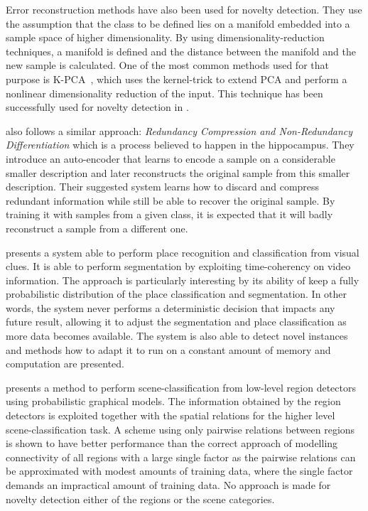 Error reconstruction methods have also been used for novelty detection.
They use the assumption that the class to be defined lies on a manifold embedded
into a sample space of higher dimensionality. By using dimensionality\hyp{}reduction
techniques, a manifold is defined and the distance between the manifold and the new sample
is calculated. One of the most common methods used for that purpose is
\gls{K-PCA}~\cite{scholkopf1997kernel}, which uses the kernel-trick to extend
\gls{PCA} and perform a nonlinear dimensionality reduction of the input.
This technique has been successfully used for novelty detection in \cite{Hoffmann2007863}.

\cite{japkowicz1995novelty} also follows a similar approach: \emph{Redundancy
Compression and Non-Redundancy Differentiation} which is a process believed
to happen in the hippocampus. They introduce an auto-encoder
that learns to encode a sample on a considerable smaller description and later reconstructs
the original sample from this smaller description. Their suggested system
learns how to discard and compress redundant information while still be able to recover
the original sample. By training it with samples from a given class, it
is expected that it will badly reconstruct a sample from a different one.

\cite{ranganathan2010pliss} presents a system able to perform place recognition
and classification from visual clues. It is able to perform segmentation by
exploiting time-coherency on video information. The approach is particularly
interesting by its ability of keep a fully probabilistic distribution of
the place classification and segmentation. In other words, the system never performs
a deterministic decision that impacts any future result, allowing it to adjust
the segmentation and place classification as more data becomes available.
The system is also able to detect novel instances and methods how to adapt it
to run on a constant amount of memory and computation are presented.

\cite{boutell2006factor} presents a method to perform scene-classification
from low-level region detectors using probabilistic graphical models.
The information obtained by the region detectors is exploited together with the
spatial relations for the higher level scene-classification task.
A scheme using only pairwise relations between regions is shown to
have better performance than the correct approach of modelling connectivity of all regions 
with a large single factor as the pairwise relations can be
approximated with modest amounts of training data, where the single factor
demands an impractical amount of training data.
No approach is made for novelty detection either of the regions or the scene
categories. 


